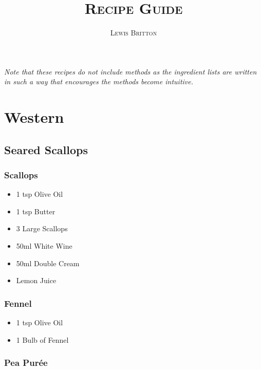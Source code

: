 \documentclass[11pt, english]{article}
\begin{document}

	\title{\huge\textsc{Recipe Guide}}
	\author{\Large\textsc{Lewis Britton}}
	\date{}
	\maketitle

	\textit{Note that these recipes do not include methods as the ingredient lists are written in such a way that encourages the methods become intuitive.}

	\renewcommand{\contentsname}{Table of Contents}

	\tableofcontents

\newpage


\section{Western}

	\subsection{Seared Scallops}

		\subsubsection*{Scallops}

	\begin{itemize}
	\setlength\itemsep{0cm}
		\item 1 tsp Olive Oil
		\item 1 tsp Butter
		\item 3 Large Scallops
		\item 50ml White Wine
		\item 50ml Double Cream
		\item Lemon Juice
	\end{itemize}

		\subsubsection*{Fennel}

	\begin{itemize}
	\setlength\itemsep{0cm}
		\item 1 tsp Olive Oil
		\item 1 Bulb of Fennel
	\end{itemize}

		\subsubsection*{Pea Pur\'{e}e}
\end{document}
